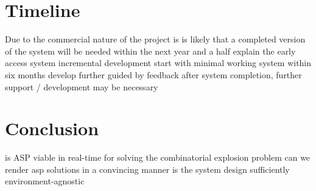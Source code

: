 \documentclass[11pt]{report}
\begin{document}
\chapter{Timeline}
	Due to the commercial nature of the project is is likely that a completed version of the system will be needed within the next year and a half
	explain the early access system
	incremental development
	start with minimal working system within six months
	develop further guided by feedback
	after system completion, further support / development may be necessary

\chapter{Conclusion}
	is ASP viable in real-time for solving the combinatorial explosion problem
	can we render asp solutions in a convincing manner
	is the system design sufficiently environment-agnostic





\end{document}
